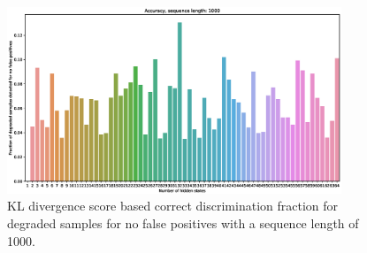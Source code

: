 \documentclass[journal]{IEEEtran}
\begin{document}
\begin{figure}[h]
 \centering
 \includegraphics[width=10cm,keepaspectratio=true]{./accuracy_1000.eps}
 \caption{KL divergence score based correct discrimination fraction for degraded samples for no false positives with a sequence length of 1000.}
 \label{figure:discrimination_rate_1000}
\end{figure}
\end{document}
